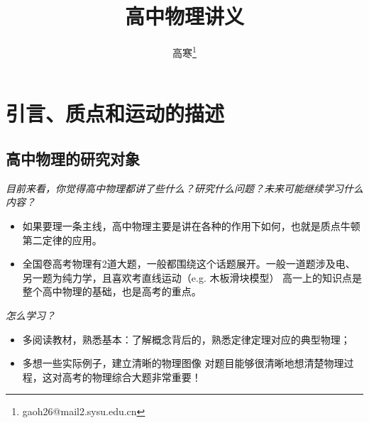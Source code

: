 \documentclass[a4paper,9pt]{ctexart}
\title{高中物理讲义}
\author{高寒\footnote{gaoh26@mail2.sysu.edu.cn}}
\begin{document}
\maketitle
\tableofcontents
\newpage
\section{引言、质点和运动的描述}
\subsection{高中物理的研究对象}
\emph{目前来看，你觉得高中物理都讲了些什么？研究什么问题？未来可能继续学习什么内容？}
\begin{itemize}
\item
如果要理一条主线，高中物理主要是讲在各种的作用下如何，也就是质点牛顿第二定律的应用。
\item
全国卷高考物理有2道大题，一般都围绕这个话题展开。一般一道题涉及电、另一题为纯力学，且喜欢考直线运动（e.g. 木板滑块模型） \so 高一上的知识点是整个高中物理的基础，也是高考的重点。
\end{itemize}
\emph{怎么学习？}
\begin{itemize}
\item
多阅读教材，熟悉基本：了解概念背后的，熟悉定律定理对应的典型物理；
\item
多想一些实际例子，建立清晰的物理图像 \so 对题目能够很清晰地想清楚物理过程，这对高考的物理综合大题非常重要！
\end{itemize}
\end{document}
